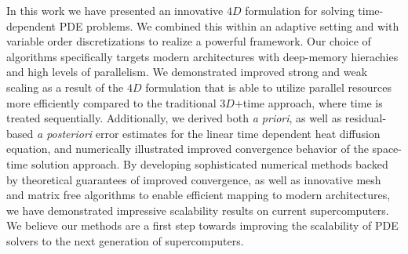
In this work we have presented an innovative $4D$ formulation for solving time-dependent PDE problems. We combined this within an adaptive setting and with variable order discretizations to realize a powerful framework. Our choice of algorithms specifically targets modern architectures with deep-memory hierachies and high levels of parallelism. We demonstrated improved strong and weak scaling as a result of the $4D$ formulation that is able to utilize parallel resources more efficiently compared to the traditional $3D$+time approach, where time is treated sequentially. Additionally, we derived both {\it a priori}, as well as residual-based {\it a posteriori} error estimates for the linear time dependent heat diffusion equation, and numerically illustrated improved convergence behavior of the space-time solution approach. By developing sophisticated numerical methods backed by theoretical guarantees of improved convergence, as well as innovative mesh and matrix free algorithms to enable efficient mapping to modern architectures, we have demonstrated impressive scalability results on current supercomputers.
We believe our methods are a first step towards improving the scalability of PDE solvers to the next generation of supercomputers. 


